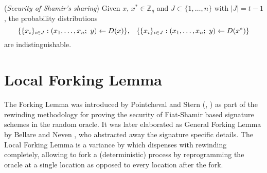 \documentclass{iacrtrans}
\begin{document}
\begin{rem}\label{shamir_security}
(\textit{Security of Shamir's sharing})
Given $x,\hspace{2pt} x^* \in \mathbb{Z}_q$ and
$J \subset \{1, \dots, n\}$ with $|J| = t - 1$,
the probability distributions
\vspace{5pt}
\begin{equation*}
\{\{x_i\}_{i \in J}:
(x_1, \dots, x_n;\ y) \leftarrow D(x)\},
\hspace{8pt}
\{\{x_i\}_{i \in J}:
(x_1, \dots, x_n;\ y) \leftarrow D(x^*)\}
\vspace{5pt}
\end{equation*}
are indistinguishable.
\end{rem}

\section{Local Forking Lemma}\label{section_local_forking_lemma}

\noindent
The Forking Lemma was introduced by
Pointcheval and Stern
(\cite{paper_pointcheval_stern_1}, \cite{paper_pointcheval_stern_2})
as part of the rewinding methodology for proving
the security of Fiat-Shamir based signature schemes
in the random oracle. It was later elaborated as
General Forking Lemma by Bellare and Neven
\cite{paper_bellare_musig}, who
abstracted away the signature specific details.
The Local Forking Lemma is a variance
by \cite{paper_bellare_local_forking}
which dispenses with rewinding completely,
allowing to fork a (deterministic) process
by reprogramming the oracle at a single location
as opposed to every location after the fork.
\end{document}
